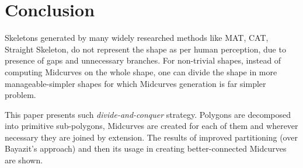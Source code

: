 \section{Conclusion}

Skeletons generated by many widely researched methods like MAT, CAT, Straight Skeleton, do not represent the shape as per human perception, due to presence of gaps and unnecessary branches. For non-trivial shapes, instead of computing Midcurves on the whole shape, one can divide the shape in more manageable-simpler shapes for which Midcurves generation is far simpler problem. 

This paper presents such {\em divide-and-conquer} strategy. Polygons are decomposed into primitive sub-polygons, Midcurves are created for each of them and wherever necessary they are joined by extension.  The results of improved partitioning (over Bayazit's \cite{Bayazit} approach) and then its usage in creating better-connected Midcurves are shown.
